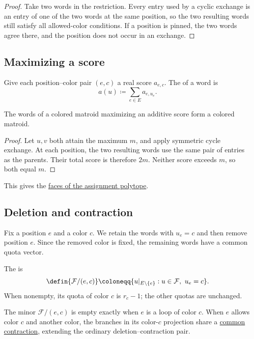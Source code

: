 \begin{proof}
Take two words in the restriction. Every entry used by a cyclic exchange is
an entry of one of the two words at the same position, so the two resulting
words still satisfy all allowed-color conditions. If a position is pinned,
the two words agree there, and the position does not occur in an exchange.
\end{proof}

\subsection[scoreMaximizers]{Maximizing a score}

Give each position--color pair $(e,c)$ a real score $a_{e,c}$. The
 of a word is
\[
 a(u)\coloneqq\sum_{e\in E}a_{e,u_e}.
\]

\begin{proposition}
The words of a colored matroid maximizing an additive score form a colored
matroid.
\end{proposition}

\begin{proof}
Let $u,v$ both attain the maximum $m$, and apply symmetric cycle exchange.
At each position, the two resulting words use the same pair of entries as
the parents. Their total score is therefore $2m$. Neither score exceeds $m$,
so both equal $m$.
\end{proof}

This gives the \href{polytope.htm#polytopeFaces}{faces of the assignment
polytope}.

\subsection[deletionAndContraction]{Deletion and contraction}

Fix a position $e$ and a color $c$. We retain the words with $u_e=c$ and
then remove position $e$. Since the removed color is fixed, the remaining
words have a common quota vector.

\begin{definition}
The  is
\[
 \defin{\mathcal F/(e,c)}
 \coloneqq
 \{u|_{E\setminus\{e\}}:u\in\mathcal F,\ u_e=c\}.
\]
When nonempty, its quota of color $c$ is $r_c-1$; the other quotas are
unchanged.
\end{definition}

The minor $\mathcal F/(e,c)$ is empty exactly when $e$ is a loop of color
$c$.
When $e$ allows color $c$ and another color, the branches in its
color-$c$ projection share a \href{rank-flats.htm#branchQuotients}{common
contraction}, extending the ordinary deletion--contraction pair.

